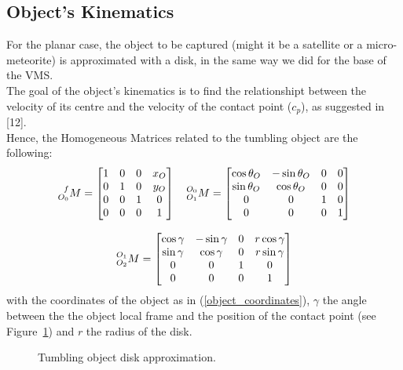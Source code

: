 \documentclass[a4paper,12pt,oneside]{report}
\begin{document}
\subsection{Object's Kinematics}
For the planar case, the object to be captured (might it be a satellite or a micro-meteorite) is approximated with a  disk, in the same way we did for the base of the VMS.\\
The goal of the object's kinematics is to find the relationshipt between the velocity of its centre and the velocity of the contact point ($c_p$), as suggested in [12].\\
Hence, the Homogeneous Matrices related to the tumbling object are the following:
\begin{equation}
  \begin{array}{c}
    \prescript{f}{O_0}{M}=\begin{bmatrix}
      1&0&0&x_O\\
    0&1&0&y_O\\
    0&0&1&0\\
    0&0&0&1
    \end{bmatrix}\quad
    \prescript{O_0}{O_1}{M}=\begin{bmatrix}
      \cos{\theta_O}&-\sin{\theta_O}&0&0\\
      \sin{\theta_O}&\cos{\theta_O}&0&0\\
      0&0&1&0\\
      0&0&0&1
    \end{bmatrix}\\
    \\
    \prescript{O_1}{O_2}{M}=\begin{bmatrix}
      \cos{\gamma}&-\sin{\gamma}&0&r \cos{\gamma}\\
      \sin{\gamma}&\cos{\gamma}&0&r \sin{\gamma}\\
      0&0&1&0\\
      0&0&0&1
    \end{bmatrix}
  \end{array}
\end{equation}
with the coordinates of the object as in (\ref{object_coordinates}), $\gamma$ the angle between the the object local frame and the position of the contact point (see Figure~\ref{contact_point}) and $r$ the radius of the disk.\\
\begin{figure}[h]
  \centering
  
  \caption{Tumbling object disk approximation.}
  \label{contact_point}
\end{figure}
\end{document}
